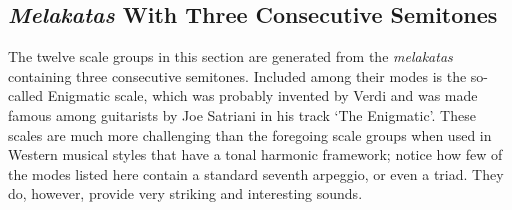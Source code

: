 \documentclass[english]{./gbook}
\begin{document}
\begin{large}
\section{\emph{Melakatas} With Three Consecutive Semitones}

The twelve scale groups in this section are generated from the \emph{melakatas} containing three consecutive semitones. Included among their modes is the so-called Enigmatic scale, which was probably invented by Verdi and was made famous among guitarists by Joe Satriani in his track `The Enigmatic'. These scales are much more challenging than the foregoing scale groups when used in Western musical styles that have a tonal harmonic framework; notice how few of the modes listed here contain a standard seventh arpeggio, or even a triad. They do, however, provide very striking and interesting sounds.


\end{large}
\end{document}
